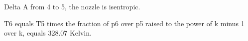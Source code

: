 Delta A from 4 to 5, the nozzle is isentropic.

T6 equals T5 times the fraction of p6 over p5 raised to the power of k minus 1 over k, equals 328.07 Kelvin.